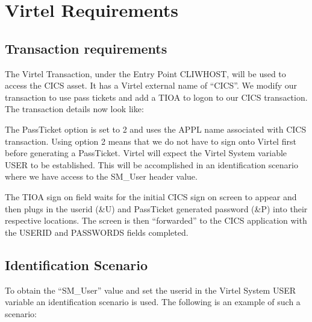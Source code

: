 \documentclass[letterpaper,10pt,english]{sphinxmanual}
\begin{document}
\newpage

\ignorespaces 

\section{Virtel Requirements}
\label{\detokenize{connectivity_guide:virtel-requirements}}\label{\detokenize{connectivity_guide:index-166}}

\subsection{Transaction requirements}
\label{\detokenize{connectivity_guide:transaction-requirements}}
\sphinxAtStartPar
The Virtel Transaction, under the Entry Point CLIWHOST, will be used to access the CICS asset. It has a Virtel external name of “CICS”. We modify our transaction to use pass tickets and add a TIOA to logon to our CICS transaction. The transaction details now look like:\sphinxhyphen{}

\sphinxAtStartPar
{} 

\sphinxAtStartPar
The PassTicket option is set to 2 and uses the APPL name associated with CICS transaction. Using option 2 means that we do not have to sign onto Virtel first before generating a PassTicket. Virtel will expect the Virtel System variable USER to be established. This will be accomplished in an identification scenario where we have access to the SM\_User header value.

\sphinxAtStartPar
The TIOA sign on field waits for the initial CICS sign on screen to appear and then plugs in the userid (\&U) and PassTicket generated password (\&P) into their respective locations. The screen is then “forwarded” to the CICS application with the USERID and PASSWORDS fields completed.

\newpage


\subsection{Identification Scenario}
\label{\detokenize{connectivity_guide:identification-scenario}}
\sphinxAtStartPar
To obtain the “SM\_User” value and set the userid in the Virtel System USER variable an identification scenario is used. The following is an example of such a scenario:\sphinxhyphen{}
\end{document}
